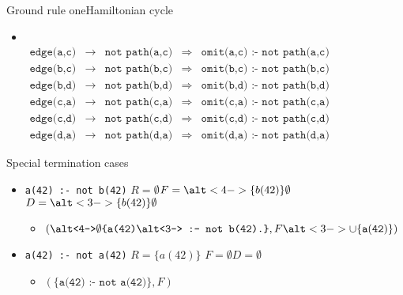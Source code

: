 \begin{frame}{Ground rule one}{Hamiltonian cycle}
\begin{itemize}
    \)
  \item <only@8->[]\small\ \\[-10pt]
    \(
    \begin{array}{ccccc}
      {\texttt{edge(a,c)}}&\rightarrow&{\texttt{not path(a,c)}}&\Rightarrow&{\texttt{omit(a,c) :- not path(a,c)}}\\
      {\texttt{edge(b,c)}}&\rightarrow&{\texttt{not path(b,c)}}&\Rightarrow&{\texttt{omit(b,c) :- not path(b,c)}}\\
      {\texttt{edge(b,d)}}&\rightarrow&{\texttt{not path(b,d)}}&\Rightarrow&{\texttt{omit(b,d) :- not path(b,d)}}\\
      {\texttt{edge(c,a)}}&\rightarrow&{\texttt{not path(c,a)}}&\Rightarrow&{\texttt{omit(c,a) :- not path(c,a)}}\\
      {\texttt{edge(c,d)}}&\rightarrow&{\texttt{not path(c,d)}}&\Rightarrow&{\texttt{omit(c,d) :- not path(c,d)}}\\
      {\texttt{edge(d,a)}}&\rightarrow&{\texttt{not path(d,a)}}&\Rightarrow&{\texttt{omit(d,a) :- not path(d,a)}}
    \end{array}
    \)
  \end{itemize}
\end{frame}
\begin{frame}{Special termination cases}
  \bigskip
  \begin{itemize}
  \item<2-> \texttt{a(42) :- not b(42)}
    \qquad
    $R=\emptyset$\quad $F=\alt<4->{\{b(42)\}}{\emptyset}$\quad $D=\alt<3->{\{b(42)\}}{\emptyset}$
    \smallskip
    \begin{itemize}\normalsize
    \item[\itarrow] $(\texttt{\alt<4->{$\emptyset$}{\{a(42)\alt<3->{ :- not b(42)}{}.\}}},F\alt<3->{}{\cup\{\mathtt{a(42)}\}})$
    \end{itemize}
    \bigskip
  \item<5-> \texttt{a(42) :- not a(42)}
    \qquad
    $R=\{a(42)\}$ \quad  $F=\emptyset$\quad $D=\emptyset$
    \smallskip
    \begin{itemize}\normalsize
    \item[\itarrow] $(\{\texttt{a(42) :- not a(42)}\},F)$
    \end{itemize}
  \end{itemize}
\end{frame}
%
